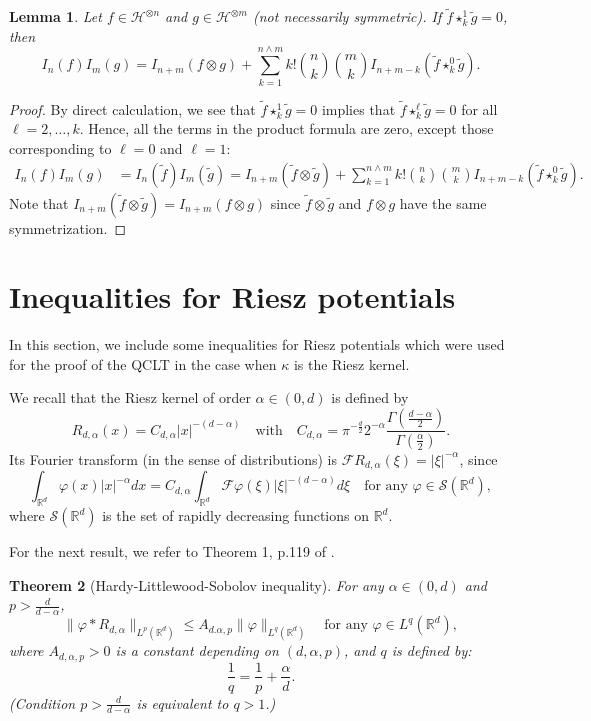 \documentclass[12pt]{article}
\newtheorem{theorem}{Theorem}[section]
\newtheorem{lemma}[theorem]{Lemma}
\def\cF{\mathcal{F}}
\def\cH{\mathcal{H}}
\def\cS{\mathcal{S}}
\def\bR{\mathbb{R}}
\def\k{\kappa}
\begin{document}
\begin{lemma}
\label{prod-lem2}
Let $f \in \cH^{\otimes n}$ and $g \in \cH^{\otimes m}$ (not necessarily symmetric).
If $\tilde{f} \star_{k}^{1} \tilde{g} =0$, then
\[
I_n(f) I_m(g)
= I_{n+m}(f\otimes g)+\sum_{k=1}^{n\wedge m}k! \binom{n}{k}\binom{m}{k}I_{n+m-k}(\tilde{f} \star_{k}^{0} \tilde{g}).
\]
\end{lemma}

\begin{proof}
By direct calculation, we see that $\tilde{f} \star_{k}^{1} \tilde{g} =0$ implies that $\tilde{f} \star_{k}^{\ell} \tilde{g} =0$ for all $\ell=2,\ldots,k$. Hence, all the terms in the product formula are zero, except those corresponding to $\ell=0$ and $\ell=1$:
\begin{align*}
I_n(f) I_m(g) &=I_n(\tilde{f}) I_m(\tilde{g})=I_{n+m}(\tilde{f} \otimes \tilde{g})+
\sum_{k=1}^{n\wedge m}k! \binom{n}{k}\binom{m}{k}I_{n+m-k}(\tilde{f} \star_{k}^{0} \tilde{g} ).
\end{align*}
Note that $I_{n+m}(\tilde{f} \otimes \tilde{g})=I_{n+m}(f \otimes g)$ since $\tilde{f} \otimes \tilde{g}$ and $f \otimes g$ have the same symmetrization.
\end{proof}


\section{Inequalities for Riesz potentials}
\label{appB}

In this section, we include some inequalities for Riesz potentials which were used for the proof of the QCLT in the case when $\k$ is the Riesz kernel.

We recall that the Riesz kernel of order $\alpha \in (0,d)$ is defined by 
\[
R_{d,\alpha}(x)=C_{d,\alpha}|x|^{-(d-\alpha)} \quad \mbox{with} \quad C_{d,\alpha}=\pi^{-\frac{d}{2}}2^{-\alpha} \frac{\Gamma(\frac{d-\alpha}{2})}{\Gamma(\frac{\alpha}{2})}.
\]
Its Fourier transform (in the sense of distributions) is $\cF R_{d,\alpha}(\xi)=|\xi|^{-\alpha}$, since
\[
\int_{\bR^d}\varphi(x)|x|^{-\alpha}dx=C_{d,\alpha} \int_{\bR^d}\cF \varphi(\xi)|\xi|^{-(d-\alpha)}d\xi \quad 
\mbox{for any $\varphi \in \cS(\bR^d)$},
\]
where $\cS(\bR^d)$ is the set of rapidly decreasing functions on $\bR^d$.

\medskip

For the next result, we refer to Theorem 1, p.119 of \cite{stein70}.

\begin{theorem}[Hardy-Littlewood-Sobolov inequality]
\label{HLS}
For any $\alpha \in (0,d)$ and $p>\frac{d}{d-\alpha}$, 
\[
\| \varphi *R_{d,\alpha}\|_{L^p(\bR^d)} \leq A_{d.\alpha,p}\|\varphi\|_{L^{q}(\bR^d)} \quad \mbox{for any $\varphi \in L^q(\bR^d)$},
\]
where $A_{d,\alpha,p}>0$ is a constant depending on $(d,\alpha,p)$, and $q$ is defined by:
\[
\frac{1}{q}=\frac{1}{p}+\frac{\alpha}{d}.
\]
(Condition $p>\frac{d}{d-\alpha}$ is equivalent to $q>1$.)
\end{theorem}
\end{document}
